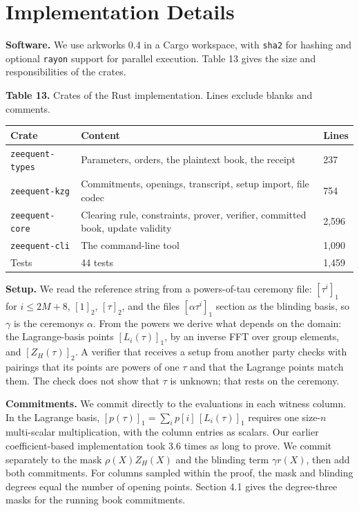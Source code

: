 
\section{Implementation Details}

\textbf{Software.} We use arkworks 0.4 in a Cargo workspace, with \texttt{sha2} for hashing and optional \texttt{rayon} support for parallel execution. Table 13 gives the size and responsibilities of the crates.

\textbf{Table 13.} Crates of the Rust implementation. Lines exclude blanks and comments.

\begin{longtable}[]{@{}lll@{}}
\toprule\noalign{}
Crate & Content & Lines \\
\midrule\noalign{}
\endhead
\bottomrule\noalign{}
\endlastfoot
\texttt{zeequent-types} & Parameters, orders, the plaintext book, the receipt & 237 \\
\texttt{zeequent-kzg} & Commitments, openings, transcript, setup import, file codec & 754 \\
\texttt{zeequent-core} & Clearing rule, constraints, prover, verifier, committed book, update validity & 2,596 \\
\texttt{zeequent-cli} & The command-line tool & 1,090 \\
Tests & 44 tests & 1,459 \\
\end{longtable}

\textbf{Setup.} We read the reference string from a powers-of-tau ceremony file: \([\tau^i]_1\) for \(i \le 2M + 8\), \([1]_2\), \([\tau]_2\), and the file\textquotesingle s \([\alpha\tau^i]_1\) section as the blinding basis, so \(\gamma\) is the ceremony\textquotesingle s \(\alpha\). From the powers we derive what depends on the domain: the Lagrange-basis points \([L_i(\tau)]_1\), by an inverse FFT over group elements, and \([Z_H(\tau)]_2\). A verifier that receives a setup from another party checks with pairings that its points are powers of one \(\tau\) and that the Lagrange points match them. The check does not show that \(\tau\) is unknown; that rests on the ceremony.

\textbf{Commitments.} We commit directly to the evaluations in each witness column. In the Lagrange basis, \([p(\tau)]_1=\sum_i p[i]\,[L_i(\tau)]_1\) requires one size-\(n\) multi-scalar multiplication, with the column entries as scalars. Our earlier coefficient-based implementation took 3.6 times as long to prove. We commit separately to the mask \(\rho(X)Z_H(X)\) and the blinding term \(\gamma r(X)\), then add both commitments. For columns sampled within the proof, the mask and blinding degrees equal the number of opening points. Section 4.1 gives the degree-three masks for the running book commitments.

